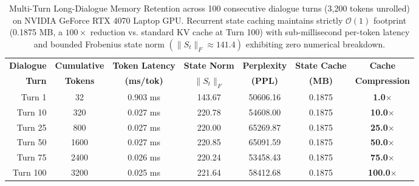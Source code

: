 
\begin{table}[t]
\centering
\caption{Multi-Turn Long-Dialogue Memory Retention across 100 consecutive dialogue turns (3,200 tokens unrolled) on NVIDIA GeForce RTX 4070 Laptop GPU. Recurrent state caching maintains strictly $\mathcal{O}(1)$ footprint (0.1875 MB, a $100\times$ reduction vs. standard KV cache at Turn 100) with sub-millisecond per-token latency and bounded Frobenius state norm $(\|S_t\|_F \approx 141.4)$ exhibiting zero numerical breakdown.}
\label{tab:multiturn_dialogue}
\small
\begin{tabular}{rcccccc}
\toprule
\textbf{Dialogue} & \textbf{Cumulative} & \textbf{Token Latency} & \textbf{State Norm} & \textbf{Perplexity} & \textbf{State Cache} & \textbf{Cache} \\
\textbf{Turn} & \textbf{Tokens} & \textbf{(ms/tok)} & \textbf{$\|S_t\|_F$} & \textbf{(PPL)} & \textbf{(MB)} & \textbf{Compression} \\
\midrule
Turn 1 & 32 & 0.903 ms & 143.67 & 50606.16 & 0.1875 & \textbf{1.0}$\times$ \\
Turn 10 & 320 & 0.027 ms & 220.78 & 54608.00 & 0.1875 & \textbf{10.0}$\times$ \\
Turn 25 & 800 & 0.027 ms & 220.00 & 65269.87 & 0.1875 & \textbf{25.0}$\times$ \\
Turn 50 & 1600 & 0.027 ms & 220.85 & 65091.59 & 0.1875 & \textbf{50.0}$\times$ \\
Turn 75 & 2400 & 0.026 ms & 220.24 & 53458.43 & 0.1875 & \textbf{75.0}$\times$ \\
Turn 100 & 3200 & 0.025 ms & 221.64 & 58412.68 & 0.1875 & \textbf{100.0}$\times$ \\
\bottomrule
\end{tabular}
\end{table}
